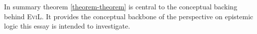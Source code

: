 
In summary theorem \ref{theorem-theorem} is central
to the conceptual backing behind \textsc{EviL}.  
It provides the conceptual backbone of the perspective on 
epistemic logic this essay is intended to investigate.

